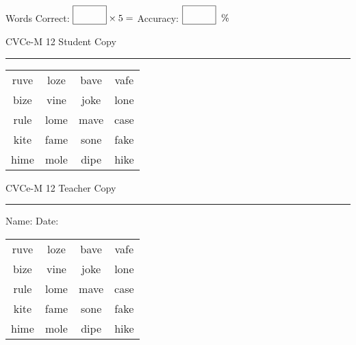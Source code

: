 \documentclass{memoir}
\begin{document}
\small

Words Correct: $\fbox{\phantom{\huge 100}} \times 5 = $ Accuracy: $\fbox{\phantom{\huge 100}}\;\; \%$ 

\vfill

\newpage


\footnotesize \noindent
CVCe-M 12 \hfill Student Copy
\smallskip
\hrule

\Large

\setlength{\tabcolsep}{14pt}
\def\arraystretch{2}

{\selectfont


\begin{vplace}[0.5]
\begin{center}
\begin{tabular}{cccc}
ruve & loze & bave & vafe \\
bize & vine & joke & lone \\
rule & lome & mave & case \\
kite & fame & sone & fake \\
hime & mole & dipe & hike \\
\end{tabular}
\end{center}
\end{vplace}

}

\newpage

\footnotesize \noindent
CVCe-M 12 \hfill Teacher Copy
\smallskip
\hrule

\small

\vfill

\noindent
Name: \underline{\hspace{1.75in}} \hfill Date: \underline{\hspace{1in}}

\Large

{\selectfont


\begin{vplace}[0.5]
\begin{center}
\begin{tabular}{cccc}
ruve & loze & bave & vafe \\
bize & vine & joke & lone \\
rule & lome & mave & case \\
kite & fame & sone & fake \\
hime & mole & dipe & hike \\
\end{tabular}
\end{center}
\end{vplace}



}
\end{document}

